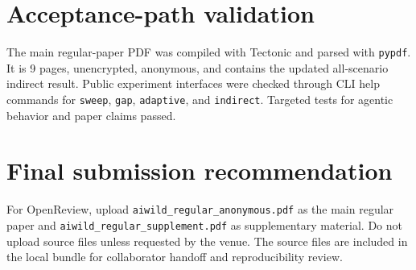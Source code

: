 \documentclass[10pt]{article}
\begin{document}
\section{Acceptance-path validation}
The main regular-paper PDF was compiled with Tectonic and parsed with \texttt{pypdf}. It is 9 pages, unencrypted, anonymous, and contains the updated all-scenario indirect result. Public experiment interfaces were checked through CLI help commands for \texttt{sweep}, \texttt{gap}, \texttt{adaptive}, and \texttt{indirect}. Targeted tests for agentic behavior and paper claims passed.

\section{Final submission recommendation}
For OpenReview, upload \texttt{aiwild\_regular\_anonymous.pdf} as the main regular paper and \texttt{aiwild\_regular\_supplement.pdf} as supplementary material. Do not upload source files unless requested by the venue. The source files are included in the local bundle for collaborator handoff and reproducibility review.
\end{document}
